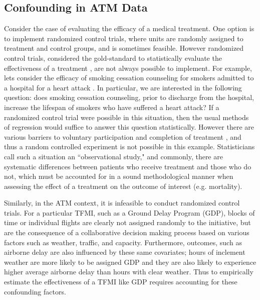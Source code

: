 \documentclass[conference]{IEEEtran}
\begin{document}
\subsection{Confounding in ATM Data}
Consider the case of evaluating the efficacy of a medical treatment.  One option is to implement randomized control trials, where units are randomly assigned to treatment and control groups, and is sometimes feasible.  However randomized control trials, considered the gold-standard to statistically evaluate the effectiveness of a treatment \cite{austin2011introduction}, are not always possible to implement.  For example, lets consider the efficacy of smoking cessation counseling for smokers admitted to a hospital for a heart attack \cite{austin2011tutorial}.  In particular, we are interested in the following question: does smoking cessation counseling, prior to discharge from the hospital, increase the lifespan of smokers who have suffered a heart attack?  If a randomized control trial were possible in this situation, then the usual methods of regression would suffice to answer this question statistically.  However there are various barriers to voluntary participation and completion of treatment \cite{austin2011tutorial}, and thus a random controlled experiment is not possible in this example.  Statisticians call such a situation an ``observational study," and commonly, there are systematic differences between patients who receive treatment and those who do not, which must be accounted for in a sound methodological manner when assessing the effect of a treatment on the outcome of interest (e.g. mortality). 

Similarly, in the ATM context, it is infeasible to conduct randomized control trials.  For a particular TFMI, such as a Ground Delay Program (GDP), blocks of time or individual flights are clearly not assigned randomly to the initiative, but are the consequence of a collaborative decision making process based on various factors such as weather, traffic, and capacity.  Furthermore, outcomes, such as airborne delay are also influenced by these same covariates; hours of inclement weather are more likely to be assigned GDP and they are also likely to experience higher average airborne delay than hours with clear weather.  Thus to empirically estimate the effectiveness of a TFMI like GDP requires accounting for these confounding factors.
\end{document}
